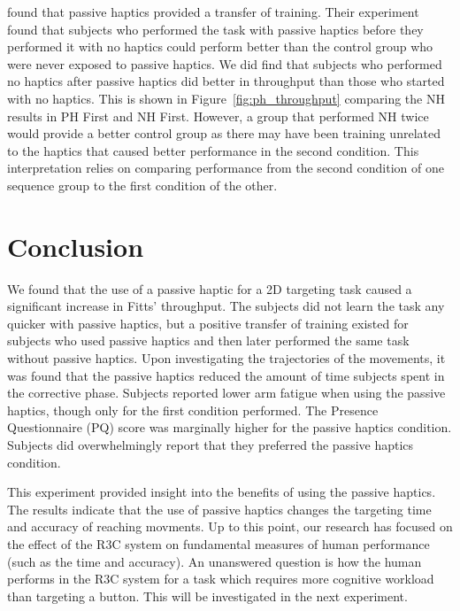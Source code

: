 \citet{insko_passive_2001} found that passive haptics provided a transfer of training.
Their experiment found that subjects who performed the task with passive haptics before they performed it with no haptics could perform better than the control group who were never exposed to passive haptics.
We did find that subjects who performed no haptics after passive haptics did better in throughput than those who started with no haptics.
This is shown in Figure~\ref{fig:ph_throughput} comparing the NH results in PH First and NH First.
However, a group that performed NH twice would provide a better control group as there may have been training unrelated to the haptics that caused better performance in the second condition.
This interpretation relies on comparing performance from the second condition of one sequence group to the first condition of the other.

\section{Conclusion}

We found that the use of a passive haptic for a 2D targeting task caused a significant increase in Fitts' throughput.
The subjects did not learn the task any quicker with passive haptics, but a positive transfer of training existed for subjects who used passive haptics and then later performed the same task without passive haptics.
Upon investigating the trajectories of the movements, it was found that the passive haptics reduced the amount of time subjects spent in the corrective phase.
Subjects reported lower arm fatigue when using the passive haptics, though only for the first condition performed.
The Presence Questionnaire (PQ) score was marginally higher for the passive haptics condition.
Subjects did overwhelmingly report that they preferred the passive haptics condition.

This experiment provided insight into the benefits of using the passive haptics.
The results indicate that the use of passive haptics changes the targeting time and accuracy of reaching movments.
Up to this point, our research has focused on the effect of the R3C system on fundamental measures of human performance (such as the time and accuracy).
An unanswered question is how the human performs in the R3C system for a task which requires more cognitive workload than targeting a button.
This will be investigated in the next experiment.
